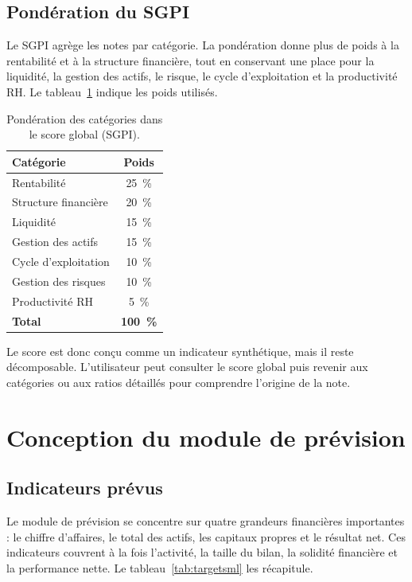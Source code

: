 \subsection{Pondération du SGPI}
\par Le \ac{SGPI} agrège les notes par catégorie. La pondération donne plus de
poids à la rentabilité et à la structure financière, tout en conservant une
place pour la liquidité, la gestion des actifs, le risque, le cycle
d'exploitation et la productivité RH. Le tableau~\ref{tab:poids} indique les
poids utilisés.

\begin{table}[H]
\centering
\caption[Pondération des catégories du SGPI]{Pondération des catégories dans le score global (SGPI).}
\label{tab:poids}
\begin{tabular}{|l|c|}
\hline
\textbf{Catégorie} & \textbf{Poids} \\ \hline
Rentabilité & 25~\% \\ \hline
Structure financière & 20~\% \\ \hline
Liquidité & 15~\% \\ \hline
Gestion des actifs & 15~\% \\ \hline
Cycle d'exploitation & 10~\% \\ \hline
Gestion des risques & 10~\% \\ \hline
Productivité RH & 5~\% \\ \hline
\textbf{Total} & \textbf{100~\%} \\ \hline
\end{tabular}
\end{table}

\par Le score est donc conçu comme un indicateur synthétique, mais il reste
décomposable. L'utilisateur peut consulter le score global puis revenir aux
catégories ou aux ratios détaillés pour comprendre l'origine de la note.

\section{Conception du module de prévision}
\label{sec:concep_ml}
\subsection{Indicateurs prévus}
\par Le module de prévision se concentre sur quatre grandeurs financières
importantes : le chiffre d'affaires, le total des actifs, les capitaux propres
et le résultat net. Ces indicateurs couvrent à la fois l'activité, la taille du
bilan, la solidité financière et la performance nette. Le
tableau~\ref{tab:targetsml} les récapitule.

